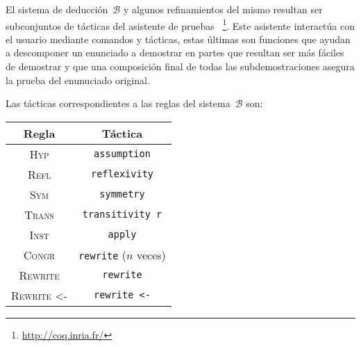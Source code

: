 \documentclass[11pt,letterpaper]{article}
\begin{document}
El sistema de deducci\'on~$\mathcal{B}$ y algunos refinamientos del mismo 
resultan ser subconjuntos de t\'acticas del asistente de pruebas 
{\coq}~\footnote{\url{http://coq.inria.fr/}}.
Este asistente interact\'ua con el usuario mediante comandos y t\'acticas, 
estas \'ultimas son funciones que ayudan a descomponer un enunciado a demostrar 
en partes que resultan ser m\'as f\'aciles de demostrar y que una 
composici\'on final de todas las subdemostraciones asegura la prueba del 
enunuciado original.

Las t\'acticas correspondientes a las reglas del sistema~$\mathcal{B}$ son:
\begin{center}
\begin{tabular}{c|c}
 Regla & T\'actica \\\hline
 \textsc{Hyp} & \verb=assumption= \\
 \textsc{Refl} & \verb=reflexivity= \\
 \textsc{Sym} & \verb=symmetry= \\
 \textsc{Trans} & \verb=transitivity r= \\
 \textsc{Inst} & \verb=apply= \\
 \textsc{Congr} & \verb=rewrite=  ($n$ veces)\\
 \textsc{Rewrite} & \verb=rewrite= \\
 \textsc{Rewrite <-} & \verb=rewrite <-= \\
\end{tabular}
\end{center}
\end{document}
